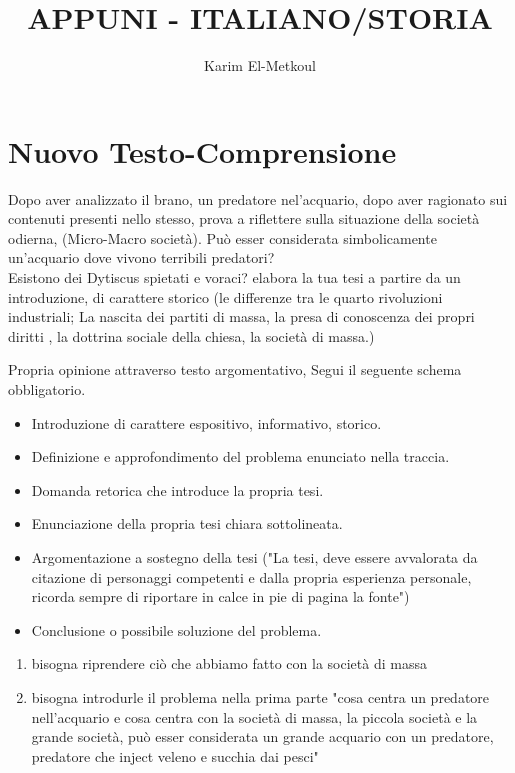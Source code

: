 \documentclass{article}
\title{APPUNI - ITALIANO/STORIA}
\author{Karim El-Metkoul}
\begin{document}
\maketitle

\section{Nuovo Testo-Comprensione}
Dopo aver analizzato il brano, un predatore nel'acquario, dopo aver ragionato sui contenuti
 presenti nello stesso, prova a riflettere sulla situazione della società odierna, (Micro-Macro società).
Può esser considerata simbolicamente un'acquario dove vivono terribili predatori?
\\Esistono dei Dytiscus spietati e voraci?
elabora la tua tesi a partire da un introduzione, di carattere storico (le differenze tra le quarto rivoluzioni industriali; La nascita dei partiti di massa, la presa di conoscenza dei propri diritti , la dottrina sociale della chiesa, la società di massa.)

Propria opinione attraverso testo argomentativo, Segui il seguente schema obbligatorio.\\

\graphicspath{ {image.png} }

\begin{itemize}
    \item Introduzione di carattere espositivo, informativo, storico.
    \item Definizione e approfondimento del problema enunciato nella traccia.
    \item Domanda retorica che introduce la propria tesi. 
    \item Enunciazione della propria tesi chiara sottolineata.
    \item Argomentazione a sostegno della tesi ("La tesi, deve essere avvalorata da citazione di personaggi competenti e dalla propria esperienza personale, ricorda sempre di riportare in calce 
    in pie di pagina la fonte")
    \item Conclusione o possibile soluzione del problema.

\end{itemize}   

\begin{enumerate}
  \item bisogna riprendere ciò che abbiamo fatto con la società di massa
  \item bisogna introdurle il problema nella prima parte "cosa centra un predatore nell'acquario e cosa centra con la società di massa,
  la piccola società e la grande società, può esser considerata un grande acquario con un predatore,
  predatore che inject veleno e succhia dai pesci"
\end{enumerate}
\end{document}
